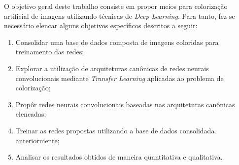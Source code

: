 O objetivo geral deste trabalho consiste em propor meios para colorização artificial de imagens utilizando técnicas de \textit{Deep Learning}. Para tanto, fez-se necessário elencar alguns objetivos específicos descritos a seguir:

\begin{enumerate}
	\item Consolidar uma base de dados composta de imagens coloridas para treinamento das redes;
	\item Explorar a utilização de arquiteturas canônicas de redes neurais convolucionais mediante \textit{Transfer Learning} aplicadas ao problema de colorização;
	\item Propôr redes neurais convolucionais baseadas nas arquiteturas canônicas elencadas;
	\item Treinar as redes propostas utilizando a base de dados consolidada anteriormente;
	\item Analisar os resultados obtidos de maneira quantitativa e qualitativa.
\end{enumerate}